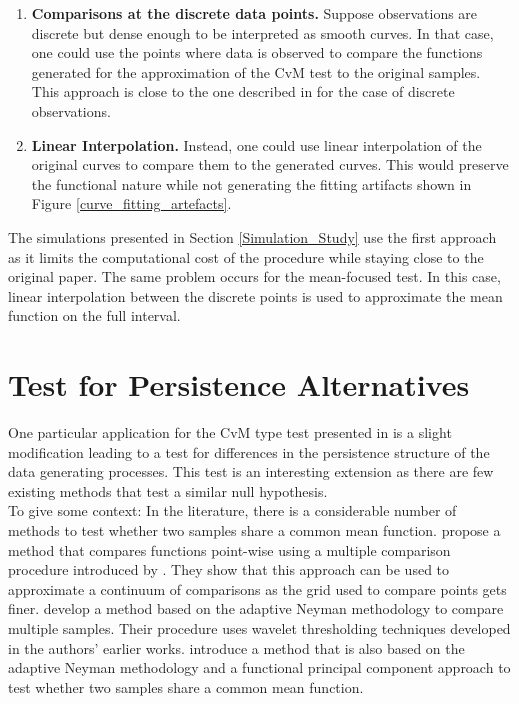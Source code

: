 \documentclass[12pt, a4paper]{article}
\theoremstyle{MAstyle} \newtheorem{assumption}{Assumption}[section]
\theoremstyle{MAstyle} \newtheorem{definition}{Definition}[section]
\theoremstyle{MAstyle} \newtheorem{theorem}{Theorem}[section]
\begin{document}
			\begin{enumerate}
				\item \textbf{Comparisons at the discrete data points.} Suppose observations are discrete but dense enough to be interpreted as smooth curves. In that case, one could use the points where data is observed to compare the functions generated for the approximation of the CvM test to the original samples. This approach is close to the one described in \cite{bugni_permutation_2021} for the case of discrete observations.
				\item \textbf{Linear Interpolation.} Instead, one could use linear interpolation of the original curves to compare them to the generated curves. This would preserve the functional nature while not generating the fitting artifacts shown in Figure \ref{curve_fitting_artefacts}.
			\end{enumerate}
			The simulations presented in Section \ref{Simulation_Study} use the first approach as it limits the computational cost of the procedure while staying close to the original paper. The same problem occurs for the mean-focused test. In this case, linear interpolation between the discrete points is used to approximate the mean function on the full interval.

	\section{Test for Persistence Alternatives}\label{variant}
		One particular application for the CvM type test presented in \cite{bugni_permutation_2021} is a slight modification leading to a test for differences in the persistence structure of the data generating processes. This test is an interesting extension as there are few existing methods that test a similar null hypothesis.\\
		
		To give some context: In the literature, there is a considerable number of methods to test whether two samples share a common mean function.
		\cite{cox_pointwise_2008} propose a method that compares functions point-wise using a multiple comparison procedure introduced by \cite{westfall_resampling-based_1993}. They show that this approach can be used to approximate a continuum of comparisons as the grid used to compare points gets finer.
		\cite{fan_test_1998} develop a method based on the adaptive Neyman methodology to compare multiple samples. Their procedure uses wavelet thresholding techniques developed in the authors' earlier works. 
		\cite{lee_two_2015} introduce a method that is also based on the adaptive Neyman methodology and a functional principal component approach to test whether two samples share a common mean function.
		
\end{document}
